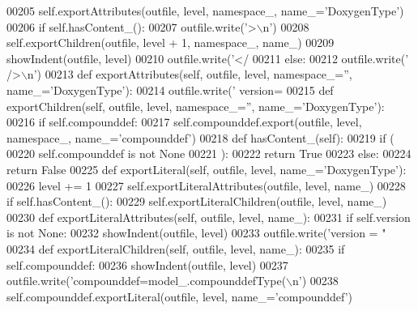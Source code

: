 \begin{DoxyCode}
{{{{{{{{{{{{{{{{{{{{{00205         self.exportAttributes(outfile, level, namespace\_, name\_=\textcolor{stringliteral}{'DoxygenType'})
00206         \textcolor{keywordflow}{if} self.hasContent_():
00207             outfile.write(\textcolor{stringliteral}{'>\(\backslash\)n'})
00208             self.exportChildren(outfile, level + 1, namespace\_, name\_)
00209             showIndent(outfile, level)
00210             outfile.write(\textcolor{stringliteral}{'</%
00211         \textcolor{keywordflow}{else}:
00212             outfile.write(\textcolor{stringliteral}{' />\(\backslash\)n'})
00213     \textcolor{keyword}{def }exportAttributes(self, outfile, level, namespace\_='', name\_='DoxygenType'):
00214         outfile.write(\textcolor{stringliteral}{' version=%
00215     \textcolor{keyword}{def }exportChildren(self, outfile, level, namespace\_='', name\_='DoxygenType'):
00216         \textcolor{keywordflow}{if} self.compounddef:
00217             self.compounddef.export(outfile, level, namespace\_, name\_=\textcolor{stringliteral}{'compounddef'})
00218     \textcolor{keyword}{def }hasContent_(self):
00219         \textcolor{keywordflow}{if} (
00220             self.compounddef \textcolor{keywordflow}{is} \textcolor{keywordflow}{not} \textcolor{keywordtype}{None}
00221             ):
00222             \textcolor{keywordflow}{return} \textcolor{keyword}{True}
00223         \textcolor{keywordflow}{else}:
00224             \textcolor{keywordflow}{return} \textcolor{keyword}{False}
00225     \textcolor{keyword}{def }exportLiteral(self, outfile, level, name\_='DoxygenType'):
00226         level += 1
00227         self.exportLiteralAttributes(outfile, level, name\_)
00228         \textcolor{keywordflow}{if} self.hasContent_():
00229             self.exportLiteralChildren(outfile, level, name\_)
00230     \textcolor{keyword}{def }exportLiteralAttributes(self, outfile, level, name\_):
00231         \textcolor{keywordflow}{if} self.version \textcolor{keywordflow}{is} \textcolor{keywordflow}{not} \textcolor{keywordtype}{None}:
00232             showIndent(outfile, level)
00233             outfile.write(\textcolor{stringliteral}{'version = "%
00234     \textcolor{keyword}{def }exportLiteralChildren(self, outfile, level, name\_):
00235         \textcolor{keywordflow}{if} self.compounddef:
00236             showIndent(outfile, level)
00237             outfile.write(\textcolor{stringliteral}{'compounddef=model\_.compounddefType(\(\backslash\)n'})
00238             self.compounddef.exportLiteral(outfile, level, name\_=\textcolor{stringliteral}{'compounddef'})
}}}}}}}}}}}}}}}}}}}}}}}}
\end{DoxyCode}
